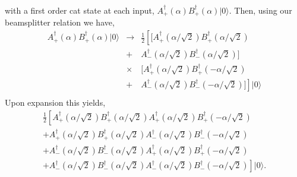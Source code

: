 \documentclass[aps,prl,twocolumn,amsmath,amssymb,nofootinbib,superscriptaddress]{revtex4}
\newcommand{\ket}[1]{|#1\rangle}
\begin{document}
with a first order cat state at each input, $A_+^\dag(\alpha)B_+^\dag(\alpha)\ket{0}$. Then, using our beamsplitter relation we have,
\begin{eqnarray}
A_+^\dag(\alpha)B_+^\dag(\alpha)\ket{0} &\to&\frac{1}{2}\left[[A_+^\dag(\alpha/\sqrt{2}) B_+^\dag(\alpha/\sqrt{2}) \right.\nonumber \\
&+& A_-^\dag(\alpha/\sqrt{2}) B_-^\dag(\alpha/\sqrt{2})] \nonumber\\
&\times& [A_+^\dag(\alpha/\sqrt{2}) B_+^\dag(-\alpha/\sqrt{2}) \nonumber \\
&+& \left.A_-^\dag(\alpha/\sqrt{2})B_-^\dag(-\alpha/\sqrt{2})]\right]\ket{0} \nonumber \\
\end{eqnarray}
Upon expansion this yields,
\begin{eqnarray}
\frac{1}{2}\left[A_+^\dag(\alpha/\sqrt{2}) B_+^\dag(\alpha/\sqrt{2}) A_+^\dag(\alpha/\sqrt{2}) B_+^\dag(-\alpha/\sqrt{2}) \right. \nonumber \\
+ A_+^\dag(\alpha/\sqrt{2}) B_+^\dag(\alpha/\sqrt{2}) A_-^\dag(\alpha/\sqrt{2})B_-^\dag(-\alpha/\sqrt{2}) \nonumber \\
+ A_-^\dag(\alpha/\sqrt{2})B_-^\dag(\alpha/\sqrt{2}) A_+^\dag(\alpha/\sqrt{2}) B_+^\dag(-\alpha/\sqrt{2}) \nonumber \\
\left. + A_-^\dag(\alpha/\sqrt{2})B_-^\dag(\alpha/\sqrt{2})A_-^\dag(\alpha/\sqrt{2})B_-^\dag(-\alpha/\sqrt{2}) \right]\ket{0}.\nonumber \\
\end{eqnarray}
\end{document}

